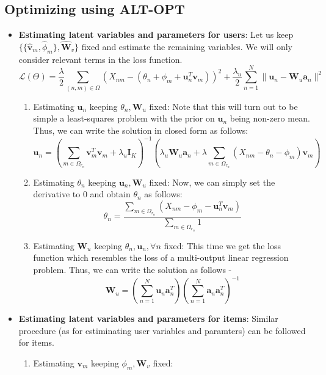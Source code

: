 \documentclass[a4paper,11pt]{article}
\begin{document}
\begin{mlsolution}
\subsection{Optimizing using ALT-OPT}
\begin{itemize}
	\item \textbf{Estimating latent variables and parameters for users}: Let us keep $\{\{\hat{\textbf{v}}_{m}, \hat{\phi}_{m}\}, \hat{\textbf{W}}_{v}\}$ fixed and estimate the remaining variables. We will only consider relevant terms in the loss function.
	\[
	\mathcal{L}(\Theta) = \frac{\lambda}{2}\sum_{(n,m)\in \Omega}(X_{nm} - (\theta_n + \phi_{m} + \textbf{u}_{n}^{T}\textbf{v}_{m}))^{2} + \frac{\lambda_{u}}{2}\sum_{n=1}^{N} \lVert \textbf{u}_{n} - \textbf{W}_{u}\textbf{a}_{n} \rVert^{2}
	\]
	\begin{enumerate}
		\item Estimating $\textbf{u}_{n}$ keeping $\theta_n , \textbf{W}_{u}$ fixed: Note that this will turn out to be simple a least-squares problem with the prior on $\textbf{u}_{n}$ being non-zero mean. Thus, we can write the solution in closed form as follows:
		\[
		\textbf{u}_{n} = \left( \sum_{m\in \Omega_{r_n}} \textbf{v}^{T}_{m}\textbf{v}_{m} + \lambda_{u}\textbf{I}_{K} \right)^{-1}\left( \lambda_{u}\textbf{W}_{u}\textbf{a}_{n} + \lambda \sum_{m\in \Omega_{r_n}} (X_{nm} - \theta_n - \phi_{m})\textbf{v}_{m} \right)  
		\]
		\item Estimating $\theta_n$ keeping $\textbf{u}_{n}, \textbf{W}_{u}$ fixed: Now, we can simply set the derivative to 0 and obtain $\theta_n$ as follows:
		\[
		\theta_n = \frac{\sum_{m\in \Omega_{r_n}}(X_{nm} - \phi_{m} - \textbf{u}^{T}_{n}\textbf{v}_{m})}{\sum_{m\in \Omega_{r_n}}1}
		\]
		\item  Estimating $\textbf{W}_{u}$ keeping $\theta_{n}, \textbf{u}_{n}, \forall n $ fixed: This time we get the loss function which resembles the loss of a multi-output linear regression problem. Thus, we can write the solution as follows -
		\[
		\textbf{W}_{u} = \left( \sum_{n=1}^{N}\textbf{u}_{n}\textbf{a}^{T}_{n} \right) \left( \sum_{n=1}^{N}\textbf{a}_{n}\textbf{a}^{T}_{n}\right)^{-1}
		\]
	\end{enumerate}
	\item \textbf{Estimating latent variables and parameters for items}: Similar procedure (as for estiminating user variables and paramters) can be followed for items.
	\begin{enumerate}
		\item Estimating $\textbf{v}_{m}$ keeping $\phi_m , \textbf{W}_{v}$ fixed: 

\end{enumerate}
\end{itemize}
\end{mlsolution}
\end{document}
